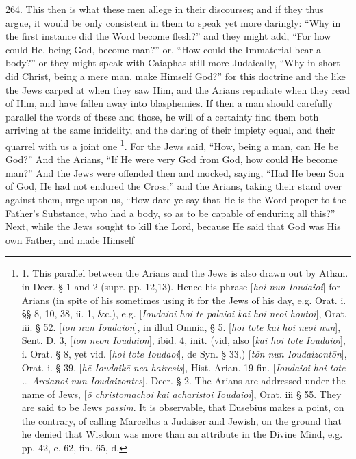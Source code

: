264.
This then is what these men allege in their discourses; and if they
thus argue, it would be only consistent in them to speak yet more
daringly: ``Why in the first instance did the Word become flesh?'' and
they might add, ``For how could He, being God, become man?'' or, ``How
could the Immaterial bear a body?'' or they might speak with Caiaphas
still more Judaically, ``Why in short did Christ, being a mere man,
make Himself God?'' for this doctrine and the like the Jews carped at
when they saw Him, and the Arians repudiate when they read of Him, and
have fallen away into blasphemies. If then a man should carefully
parallel the words of these and those, he will of a certainty find
them both arriving at the same infidelity, and the daring of their
impiety equal, and their quarrel with us a joint one \footnote{

1. This parallel
between the Arians and the Jews is also drawn out by Athan. in Decr.
§ 1 and 2 (supr. pp. 12,\emph{}13). Hence his phrase [\emph{hoi nun
Ioudaioi}] for Arians (in spite of his sometimes using it for the
Jews of his day, e.g. Orat. i. §§ 8, 10, 38, ii. 1, \&c.), e.g. [\emph{Ioudaioi
hoi te palaioi kai hoi neoi houtoi}], Orat. iii. § 52. [\emph{t\={o}n
nun Ioudai\={o}n}], in illud Omnia, § 5. [\emph{hoi tote kai hoi
neoi nun}], Sent. D. 3, [\emph{t\={o}n ne\={o}n Ioudai\={o}n}],
ibid. 4, init. (vid, also [\emph{kai hoi tote Ioudaioi}], i. Orat. § 8,
yet vid. [\emph{hoi tote Ioudaoi}], de Syn. § 33,) [\emph{t\={o}n nun
Ioudaizont\={o}n}], Orat. i. § 39. [\emph{h\={e} Ioudaik\={e}
nea hairesis}], Hist. Arian. 19 fin. [\emph{Ioudaioi hoi tote …
Areianoi nun Ioudaizontes}], Decr. § 2. The Arians are addressed
under the name of Jews, [\emph{\={o} christomachoi kai acharistoi
Ioudaioi}], Orat. iii § 55. They are said to be Jews \emph{passim}.
It is observable, that Eusebius makes a point, on the contrary, of
calling Marcellus a Judaiser and Jewish, on the ground that he denied
that Wisdom was more than an attribute in the Divine Mind, e.g. pp.
42, c. 62, fin. 65, d.}. For the Jews said, ``How, being a man, can He be God?'' And the
Arians, ``If He were very God from God, how could He become man?'' And the Jews were offended then and mocked, saying, ``Had He been Son
of God, He had not endured the Cross;'' and the Arians, taking their
stand over against them, urge upon us, ``How dare ye say that He is the
Word proper to the Father's Substance, who had a body, so as to be
capable of enduring all this?'' Next, while the Jews sought to kill the
Lord, because He said that God was His own Father, and made Himself
